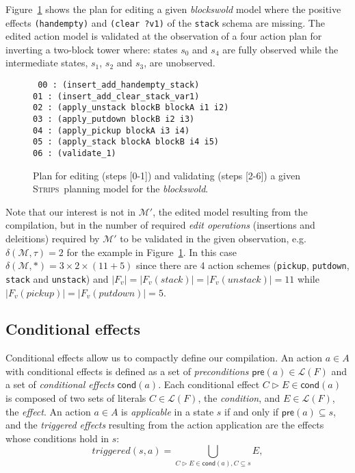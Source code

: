 \documentclass[letterpaper]{article} %
\newcommand{\pre}{\mathsf{pre}}     %
\newcommand{\cond}{\mathsf{cond}}   %
\newcommand{\strips}{\textsc{Strips}}     %
\begin{document}
Figure~\ref{fig:plan-pdistance} shows the plan for editing a given {\em blockswold} model where the positive effects {\tt\small (handempty)} and {\tt\small (clear ?v1)} of the {\tt\small stack} schema are missing. The edited action model is validated at the observation of a four action plan for inverting a two-block tower where: states $s_0$ and $s_4$ are fully observed while the intermediate states, $s_1$, $s_2$ and $s_3$, are unobserved. 
\begin{figure}
{\tt\scriptsize
00 : (insert\_add\_handempty\_stack)\\
01 : (insert\_add\_clear\_stack\_var1)\\
02 : (apply\_unstack blockB blockA i1 i2)\\
03 : (apply\_putdown blockB i2 i3)\\
04 : (apply\_pickup blockA i3 i4)\\
05 : (apply\_stack blockA blockB i4 i5)\\
06 : (validate\_1)
}
 \caption{\small Plan for editing (steps [0-1]) and validating (steps [2-6]) a given \strips\ planning model for the {\em blockswold}.}
\label{fig:plan-pdistance}
\end{figure}

Note that our interest is not in $\mathcal{M}'$, the edited model resulting from the compilation, but in the number of required {\em edit operations} (insertions and deleitions) required by $\mathcal{M}'$ to be validated in the given observation, e.g. $\delta(\mathcal{M},\tau)=2$ for the example in Figure~\ref{fig:plan-pdistance}. In this case $\delta(\mathcal{M},*)=3\times 2\times (11+5)$ since there are 4 action schemes ({\small\tt pickup}, {\small\tt putdown}, {\small\tt stack} and {\small\tt unstack}) and $|F_v|=|F_v(stack)|=|F_v(unstack)|=11$ while $|F_v(pickup)|=|F_v(putdown)|=5$. %

\subsection{Conditional effects}
Conditional effects allow us to compactly define our compilation. An action $a\in A$ with conditional effects is defined as a set of {\em preconditions} $\pre(a)\in\mathcal{L}(F)$ and a set of {\em conditional effects} $\cond(a)$. Each conditional effect $C\rhd E\in\cond(a)$ is composed of two sets of literals $C\in\mathcal{L}(F)$, the {\em condition}, and $E\in\mathcal{L}(F)$, the {\em effect}. An action $a\in A$ is {\em applicable} in a state $s$ if and only if $\pre(a)\subseteq s$, and the {\em triggered effects} resulting from the action application are the effects whose conditions hold in $s$:
\[
triggered(s,a)=\bigcup_{C\rhd E\in\cond(a),C\subseteq s} E,
\]
\end{document}

